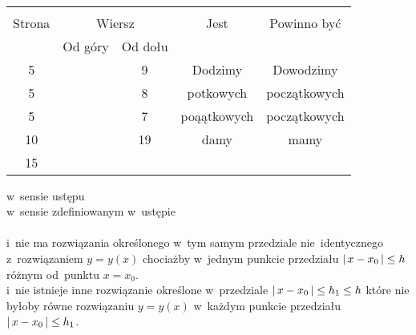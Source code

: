 \documentclass[a4paper,11pt]{article}
\begin{document}
\vspace{\spaceFour}



\start {} \Dok \\

\vspace{\spaceFour}



\start {} \Dok




\begin{center}

  \begin{tabular}{|c|c|c|c|c|}
    \hline
    & \multicolumn{2}{c|}{} & & \\
    Strona & \multicolumn{2}{c|}{Wiersz} & Jest
                              & Powinno być \\ \cline{2-3}
    & Od góry & Od dołu & & \\
    \hline
    5   & &  9 & Dodzimy & Dowodzimy \\
    5   & &  8 & potkowych & początkowych \\
    5   & &  7 & poąątkowych & początkowych \\
    10  & & 19 & damy & mamy \\
    15  & & & & \\
    \hline
  \end{tabular}

\end{center}


\noindent
{}
\Jest  w~sensie ustępu \\
\Powin w~sensie zdefiniowanym w~ustępie \\
 \\
\Jest  i~nie ma rozwiązania określonego w~tym samym przedziale
nie~identycznego z~rozwiązaniem $y = y( x )$ chociażby w~jednym
punkcie przedziału $|\, {  x - x_{ 0 }  } \,| \leq h$ różnym
od~punktu $x = x_{ 0 }$. \\
\Powin i~nie istnieje inne rozwiązanie określone w~przedziale
$|\, {  x - x_{ 0 }  } \,| \leq h_{ 1 } \leq h$ które nie byłoby równe
rozwiązaniu $y = y( x )$ w~każdym punkcie przedziału
$|\, {  x - x_{ 0 }  } \,| \leq h_{ 1 }$. \\

\vspace{\spaceTwo}











{}






\end{document}
